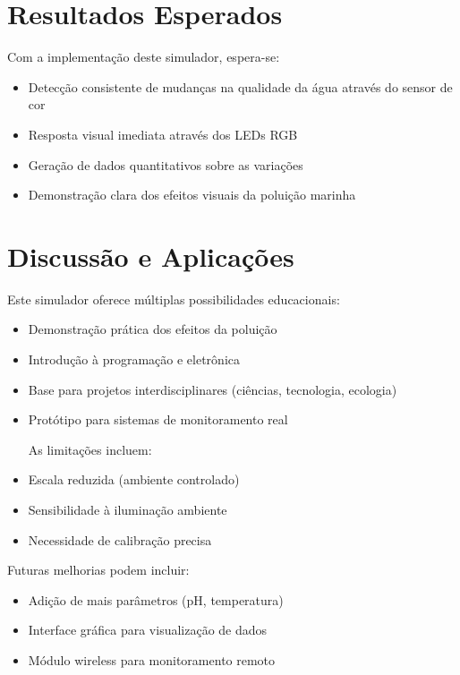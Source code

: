 \documentclass[12pt]{article}
\begin{document}
\section{Resultados Esperados}

Com a implementação deste simulador, espera-se:

\begin{itemize}
    \item Detecção consistente de mudanças na qualidade da água através do sensor de cor
    \item Resposta visual imediata através dos LEDs RGB
    \item Geração de dados quantitativos sobre as variações
    \item Demonstração clara dos efeitos visuais da poluição marinha
    
\end{itemize}

\section{Discussão e Aplicações}

Este simulador oferece múltiplas possibilidades educacionais:

\begin{itemize}
    \item Demonstração prática dos efeitos da poluição
    \item Introdução à programação e eletrônica
    \item Base para projetos interdisciplinares (ciências, tecnologia, ecologia)
    \item Protótipo para sistemas de monitoramento real
    
    As limitações incluem:
    \item Escala reduzida (ambiente controlado)
    \item Sensibilidade à iluminação ambiente
    \item Necessidade de calibração precisa
\end{itemize}

Futuras melhorias podem incluir:
\begin{itemize}
    \item Adição de mais parâmetros (pH, temperatura)
    \item Interface gráfica para visualização de dados
    \item Módulo wireless para monitoramento remoto
\end{itemize}
\end{document}
